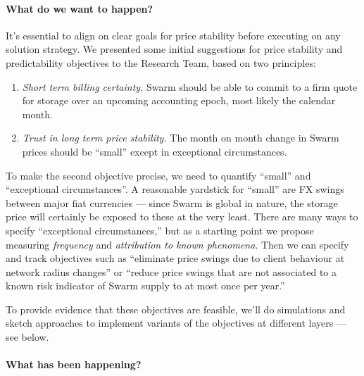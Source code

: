 \paragraph{What do we want to happen?}
%
It's essential to align on clear goals for price stability before executing on any solution strategy.
%
We presented some initial suggestions for price stability and predictability objectives to the Research Team, based on two principles:
%
\begin{enumerate}
  \item \emph{Short term billing certainty.} Swarm should be able to commit to a firm quote for storage over an upcoming accounting epoch, most likely the calendar month.
  \item \emph{Trust in long term price stability.} The month on month change in Swarm prices should be ``small'' except in exceptional circumstances.
\end{enumerate}
%
To make the second objective precise, we need to quantify ``small'' and ``exceptional circumstances''. A reasonable yardstick for ``small'' are FX swings between major fiat currencies — since Swarm is global in nature, the storage price will certainly be exposed to these at the very least.
%
There are many ways to specify ``exceptional circumstances,'' but as a starting point we propose measuring \emph{frequency} and \emph{attribution to known phenomena}.
%
Then we can specify and track objectives such as ``eliminate price swings due to client behaviour at network radius changes'' or ``reduce price swings that are not associated to a known risk indicator of Swarm supply to at most once per year.''

To provide evidence that these objectives are feasible, we'll do simulations and sketch approaches to implement variants of the objectives at different layers — see below.

\paragraph{What has been happening?}

